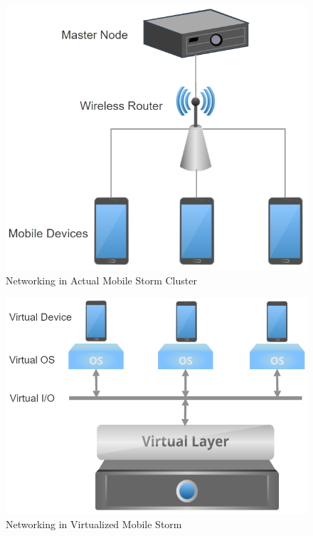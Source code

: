 \documentclass[journal,comsoc]{IEEEtran}
\begin{document}
\begin{figure}[htbp]
\begin{center}
\includegraphics[width=0.8\linewidth]{mstorm_network.png} 
\end{center}	   
\caption{Networking in Actual Mobile Storm Cluster}\label{mstorm_network}
\end{figure}

\begin{figure}[htbp]
\begin{center}
\includegraphics[width=0.8\linewidth]{virtualized_network.png} 
\end{center}	   
\caption{Networking in Virtualized Mobile Storm}\label{virtualized_network}
\end{figure}
\end{document}
